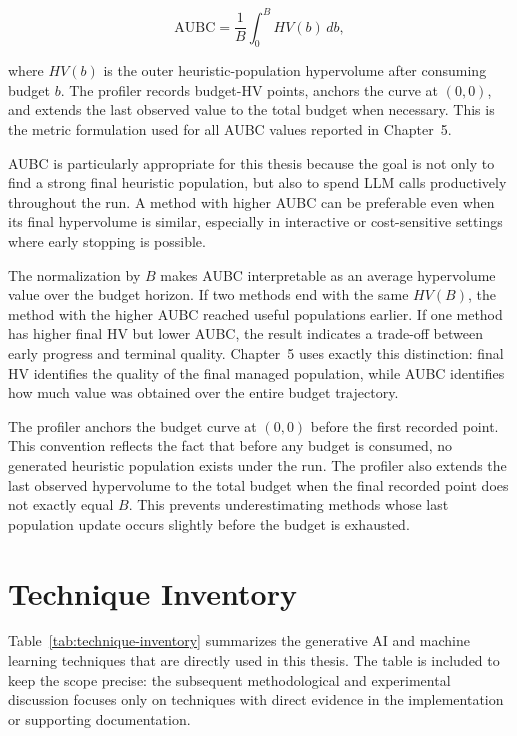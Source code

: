 \documentclass[../main.tex]{subfiles}
\begin{document}
\begin{equation}
  \mathrm{AUBC}
  =
  \frac{1}{B}
  \int_{0}^{B} HV(b)\,db,
\end{equation}

where $HV(b)$ is the outer heuristic-population hypervolume after consuming budget $b$. The profiler records budget-HV points, anchors the curve at $(0,0)$, and extends the last observed value to the total budget when necessary. This is the metric formulation used for all AUBC values reported in Chapter~5.

AUBC is particularly appropriate for this thesis because the goal is not only to find a strong final heuristic population, but also to spend LLM calls productively throughout the run. A method with higher AUBC can be preferable even when its final hypervolume is similar, especially in interactive or cost-sensitive settings where early stopping is possible.

The normalization by $B$ makes AUBC interpretable as an average hypervolume value over the budget horizon. If two methods end with the same $HV(B)$, the method with the higher AUBC reached useful populations earlier. If one method has higher final HV but lower AUBC, the result indicates a trade-off between early progress and terminal quality. Chapter~5 uses exactly this distinction: final HV identifies the quality of the final managed population, while AUBC identifies how much value was obtained over the entire budget trajectory.

The profiler anchors the budget curve at $(0,0)$ before the first recorded point. This convention reflects the fact that before any budget is consumed, no generated heuristic population exists under the run. The profiler also extends the last observed hypervolume to the total budget when the final recorded point does not exactly equal $B$. This prevents underestimating methods whose last population update occurs slightly before the budget is exhausted.

\section{Technique Inventory}

Table~\ref{tab:technique-inventory} summarizes the generative AI and machine learning techniques that are directly used in this thesis. The table is included to keep the scope precise: the subsequent methodological and experimental discussion focuses only on techniques with direct evidence in the implementation or supporting documentation.
\end{document}
